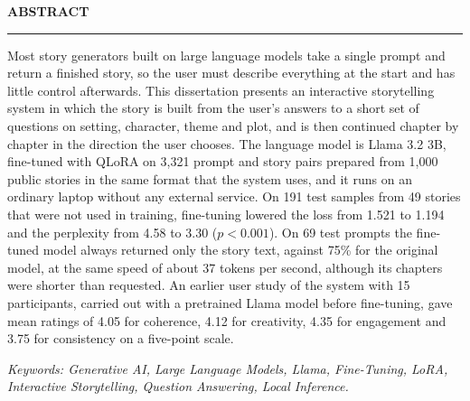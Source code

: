 \thispagestyle{empty}

\begin{center}
{\Large {\bf \uppercase{Abstract}}}
\end{center}

\vspace{\baselineskip}
\hrule
\vspace{2\baselineskip}

Most story generators built on large language models take a single prompt and return a finished story, so the user must describe everything at the start and has little control afterwards. This dissertation presents an interactive storytelling system in which the story is built from the user's answers to a short set of questions on setting, character, theme and plot, and is then continued chapter by chapter in the direction the user chooses. The language model is Llama 3.2 3B, fine-tuned with QLoRA on 3,321 prompt and story pairs prepared from 1,000 public stories in the same format that the system uses, and it runs on an ordinary laptop without any external service. On 191 test samples from 49 stories that were not used in training, fine-tuning lowered the loss from 1.521 to 1.194 and the perplexity from 4.58 to 3.30 ($p < 0.001$). On 69 test prompts the fine-tuned model always returned only the story text, against 75\% for the original model, at the same speed of about 37 tokens per second, although its chapters were shorter than requested. An earlier user study of the system with 15 participants, carried out with a pretrained Llama model before fine-tuning, gave mean ratings of 4.05 for coherence, 4.12 for creativity, 4.35 for engagement and 3.75 for consistency on a five-point scale.

\vspace{2\baselineskip}
\textit{Keywords: Generative AI, Large Language Models, Llama, Fine-Tuning, LoRA, Interactive Storytelling, Question Answering, Local Inference.}
\newpage
